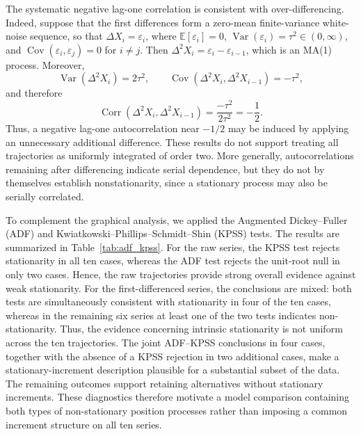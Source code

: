 \documentclass[preprint,12pt,authoryear]{elsarticle}
\begin{document}
The systematic negative lag-one correlation is consistent with over-differencing. Indeed, suppose that the first differences form a zero-mean finite-variance white-noise sequence, so that \(\Delta X_i=\varepsilon_i\), where \(\mathbb{E}[\varepsilon_i]=0\), \(\operatorname{Var}(\varepsilon_i)=\tau^2\in(0,\infty)\), and \(\operatorname{Cov}(\varepsilon_i,\varepsilon_j)=0\) for \(i\neq j\). Then \(\Delta^2X_i=\varepsilon_i-\varepsilon_{i-1}\), which is an MA(1) process. Moreover,
\[
\operatorname{Var}(\Delta^2X_i)=2\tau^2,
\qquad
\operatorname{Cov}(\Delta^2X_i,\Delta^2X_{i-1})=-\tau^2,
\]
and therefore
\[
\operatorname{Corr}(\Delta^2X_i,\Delta^2X_{i-1})
=
\frac{-\tau^2}{2\tau^2}
=
-\frac12.
\]
Thus, a negative lag-one autocorrelation near \(-1/2\) may be induced by applying an unnecessary additional difference. These results do not support treating all trajectories as uniformly integrated of order two. More generally, autocorrelations remaining after differencing indicate serial dependence, but they do not by themselves establish nonstationarity, since a stationary process may also be serially correlated.


To complement the graphical analysis, we applied the Augmented
Dickey--Fuller (ADF) and Kwiatkowski--Phillips--Schmidt--Shin (KPSS)
tests. The results are summarized in Table~\ref{tab:adf_kpss}. For the
raw series, the KPSS test rejects stationarity in all ten cases, whereas
the ADF test rejects the unit-root null in only two cases. Hence, the raw
trajectories provide strong overall evidence against weak stationarity.
For the first-differenced series, the conclusions are mixed: both tests are
simultaneously consistent with stationarity in four of the ten cases,
whereas in the remaining six series at least one of the two tests indicates
non-stationarity. Thus, the evidence concerning intrinsic stationarity is
not uniform across the ten trajectories. The joint ADF--KPSS conclusions in
four cases, together with the absence of a KPSS rejection in two additional
cases, make a stationary-increment description plausible for a substantial
subset of the data. The remaining outcomes support retaining alternatives
without stationary increments. These diagnostics therefore motivate a model
comparison containing both types of non-stationary position processes rather
than imposing a common increment structure on all ten series.
\end{document}
